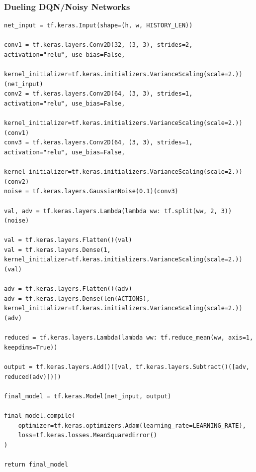 \documentclass[12pt,a4paper]{article}
\begin{document}
    \subsubsection{Dueling DQN/Noisy Networks}
    \begin{lstlisting}[label={lst:ddqnnoisy}]
net_input = tf.keras.Input(shape=(h, w, HISTORY_LEN))

conv1 = tf.keras.layers.Conv2D(32, (3, 3), strides=2, activation="relu", use_bias=False,
                               kernel_initializer=tf.keras.initializers.VarianceScaling(scale=2.))(net_input)
conv2 = tf.keras.layers.Conv2D(64, (3, 3), strides=1, activation="relu", use_bias=False,
                               kernel_initializer=tf.keras.initializers.VarianceScaling(scale=2.))(conv1)
conv3 = tf.keras.layers.Conv2D(64, (3, 3), strides=1, activation="relu", use_bias=False,
                               kernel_initializer=tf.keras.initializers.VarianceScaling(scale=2.))(conv2)
noise = tf.keras.layers.GaussianNoise(0.1)(conv3)

val, adv = tf.keras.layers.Lambda(lambda ww: tf.split(ww, 2, 3))(noise)

val = tf.keras.layers.Flatten()(val)
val = tf.keras.layers.Dense(1, kernel_initializer=tf.keras.initializers.VarianceScaling(scale=2.))(val)

adv = tf.keras.layers.Flatten()(adv)
adv = tf.keras.layers.Dense(len(ACTIONS), kernel_initializer=tf.keras.initializers.VarianceScaling(scale=2.))(adv)

reduced = tf.keras.layers.Lambda(lambda ww: tf.reduce_mean(ww, axis=1, keepdims=True))

output = tf.keras.layers.Add()([val, tf.keras.layers.Subtract()([adv, reduced(adv)])])

final_model = tf.keras.Model(net_input, output)

final_model.compile(
    optimizer=tf.keras.optimizers.Adam(learning_rate=LEARNING_RATE),
    loss=tf.keras.losses.MeanSquaredError()
)

return final_model
    \end{lstlisting}
\end{document}

